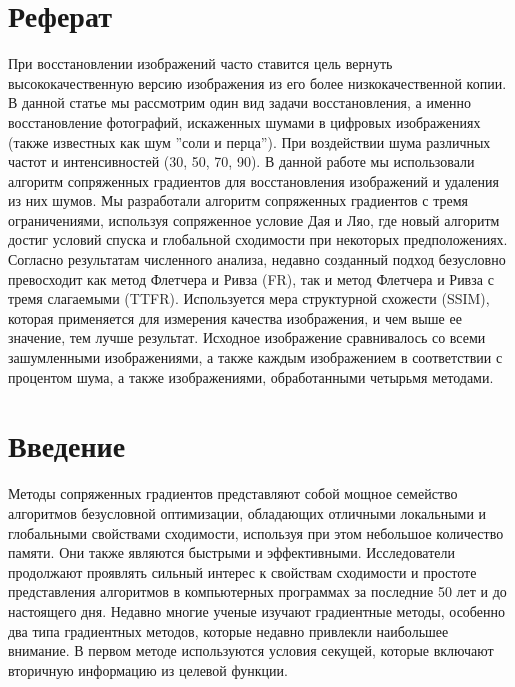



\makeatletter
\newcommand{\stackover}{\genfrac{.}{.}\z@{}}
\makeatother

\null
\vspace{\baselineskip}
\section*{Реферат}

При восстановлении изображений часто ставится цель вернуть высококачественную
версию изображения из его более низкокачественной копии. В данной статье мы
рассмотрим один вид задачи восстановления, а именно восстановление фотографий,
искаженных шумами в цифровых изображениях (также известных как шум ''соли и перца'').
При воздействии шума различных частот и интенсивностей (30, 50, 70, 90).
В данной работе мы использовали алгоритм сопряженных градиентов для
восстановления изображений и удаления из них шумов. Мы разработали алгоритм
сопряженных градиентов с тремя ограничениями, используя сопряженное условие Дая
и Ляо, где новый алгоритм достиг условий спуска и глобальной сходимости при
некоторых предположениях. Согласно результатам численного анализа, недавно
созданный подход безусловно превосходит как метод Флетчера и Ривза (FR), так и
метод Флетчера и Ривза с тремя слагаемыми (TTFR). Используется мера структурной
схожести (SSIM), которая применяется для измерения качества изображения, и чем
выше ее значение, тем лучше результат. Исходное изображение сравнивалось со
всеми зашумленными изображениями, а также каждым изображением в соответствии с
процентом шума, а также изображениями, обработанными четырьмя методами.

\section{Введение}

Методы сопряженных градиентов представляют собой мощное семейство алгоритмов
безусловной оптимизации, обладающих отличными локальными и глобальными
свойствами сходимости, используя при этом небольшое количество памяти. Они также
являются быстрыми и эффективными. Исследователи продолжают проявлять сильный
интерес к свойствам сходимости и простоте представления алгоритмов в
компьютерных программах за последние 50 лет и до настоящего дня. Недавно многие
ученые изучают градиентные методы, особенно два типа градиентных методов,
которые недавно привлекли наибольшее внимание. В первом методе используются
условия секущей, которые включают вторичную информацию из целевой функции.

